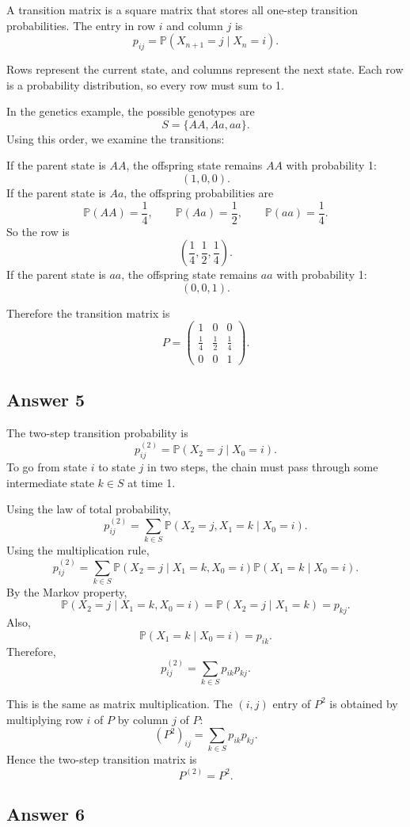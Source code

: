 \documentclass[12pt,a4paper]{article}
\theoremstyle{lecturestyle}
\newcommand{\Prob}{\mathbb{P}}
\begin{document}
A transition matrix is a square matrix that stores all one-step transition probabilities. The entry in row $i$ and column $j$ is
\[
p_{ij}=\Prob(X_{n+1}=j\mid X_n=i).
\]

Rows represent the current state, and columns represent the next state. Each row is a probability distribution, so every row must sum to 1.

In the genetics example, the possible genotypes are
\[
S=\{AA,Aa,aa\}.
\]
Using this order, we examine the transitions:

If the parent state is $AA$, the offspring state remains $AA$ with probability 1:
\[
(1,0,0).
\]
If the parent state is $Aa$, the offspring probabilities are
\[
\Prob(AA)=\frac14,\qquad
\Prob(Aa)=\frac12,\qquad
\Prob(aa)=\frac14.
\]
So the row is
\[
\left(\frac14,\frac12,\frac14\right).
\]
If the parent state is $aa$, the offspring state remains $aa$ with probability 1:
\[
(0,0,1).
\]

Therefore the transition matrix is
\[
P=
\begin{pmatrix}
1 & 0 & 0\\
\frac14 & \frac12 & \frac14\\
0 & 0 & 1
\end{pmatrix}.
\]

\subsection*{Answer 5}

The two-step transition probability is
\[
p_{ij}^{(2)}=\Prob(X_2=j\mid X_0=i).
\]
To go from state $i$ to state $j$ in two steps, the chain must pass through some intermediate state $k\in S$ at time 1.

Using the law of total probability,
\[
p_{ij}^{(2)}
=\sum_{k\in S}\Prob(X_2=j,X_1=k\mid X_0=i).
\]
Using the multiplication rule,
\[
p_{ij}^{(2)}
=\sum_{k\in S}\Prob(X_2=j\mid X_1=k,X_0=i)\Prob(X_1=k\mid X_0=i).
\]
By the Markov property,
\[
\Prob(X_2=j\mid X_1=k,X_0=i)=\Prob(X_2=j\mid X_1=k)=p_{kj}.
\]
Also,
\[
\Prob(X_1=k\mid X_0=i)=p_{ik}.
\]
Therefore,
\[
p_{ij}^{(2)}=\sum_{k\in S}p_{ik}p_{kj}.
\]

This is the same as matrix multiplication. The $(i,j)$ entry of $P^2$ is obtained by multiplying row $i$ of $P$ by column $j$ of $P$:
\[
(P^2)_{ij}=\sum_{k\in S}p_{ik}p_{kj}.
\]
Hence the two-step transition matrix is
\[
P^{(2)}=P^2.
\]

\subsection*{Answer 6}
\end{document}
